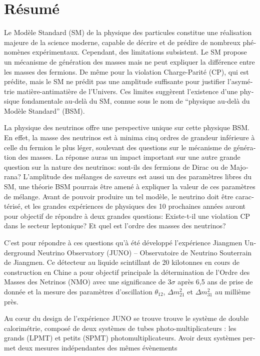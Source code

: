 \documentclass[../main.tex]{subfiles}
\begin{document}
\chapter*{Résumé}
\begin{otherlanguage}{french}

Le Modèle Standard (SM) de la physique des particules constitue une réalisation majeure de la science moderne, capable de décrire et de prédire de nombreux phénomènes expérimentaux. Cependant, des limitations subsistent. Le SM propose un mécanisme de génération des masses mais ne peut expliquer la différence entre les masses des fermions. De même pour la violation Charge-Parité (CP), qui est prédite, mais le SM ne prédit pas une amplitude suffisante  pour justifier l'asymétrie matière-antimatière de l'Univers. Ces limites suggèrent l'existence d'une physique fondamentale au-delà du SM, connue sous le nom de ``physique au-delà du Modèle Standard'' (BSM).

La physique des neutrinos offre une perspective unique sur cette physique BSM. En effet, la masse des neutrinos est à minima cinq ordres de grandeur inférieure à celle du fermion le plus léger, soulevant des questions sur le mécanisme de génération des masses. La réponse auras un impact important sur une autre grande question sur la nature des neutrinos: sont-ils des fermions de Dirac ou de Majorana? L'amplitude des mélanges de saveurs est aussi un des paramètres libres du SM, une théorie BSM pourrais être amené à expliquer la valeur de ces paramètres de mélange. Avant de pouvoir produire un tel modèle, le neutrino doit être caractérisé, et les grandes expériences de physiques des 10 prochaines années auront pour objectif de répondre à deux grandes questions: Existe-t-il une violation CP dans le secteur leptonique? Et quel est l'ordre des masses des neutrinos?

\hfill

C'est pour répondre à ces questions qu'à été développé l'expérience Jiangmen Underground Neutrino Observatory (JUNO) -- Observatoire de Neutrino Souterrain de Jiangmen. Ce détecteur au liquide scintillant de 20 kilotonnes en cours de construction en Chine a pour objectif principale la détermination de l'Ordre des Masses des Netrinos (NMO) avec une significance de 3$\sigma$ après 6,5 ans de prise de donnée et la mesure des paramètres d'oscillation $\theta_{12}$, $\Delta m^2_{21}$ et $\Delta m^2_{31}$ au millième près.

Au c\oe{}ur du design de l'expérience JUNO se trouve trouve le système de double calorimétrie, composé de deux systèmes de tubes photo-multiplicateurs : les grands (LPMT) et petits (SPMT) photomultiplicateurs. Avoir deux systèmes permet deux mesures indépendantes des mêmes évènements 


\end{otherlanguage}
\end{document}
